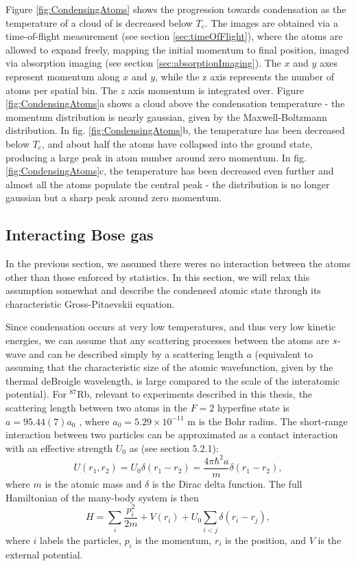Figure \ref{fig:CondensingAtoms} shows the progression towards condensation as the temperature of a cloud of \Rb{} is decreased below $T_c$. The images are obtained via a time-of-flight measurement (see section \ref{sec:timeOfFlight}), where the atoms are allowed to expand freely, mapping the initial momentum to final position, imaged via absorption imaging (see section \ref{sec:absorptionImaging}). The $x$ and $y$ axes represent momentum along $x$ and $y$, while the z axis represents the number of atoms per spatial bin. The $z$ axis momentum is integrated over.  Figure \ref{fig:CondensingAtoms}a shows a cloud above the condensation temperature - the momentum distribution is nearly gaussian, given by the Maxwell-Boltzmann distribution. In  fig. \ref{fig:CondensingAtoms}b, the temperature has been decreased below $T_c$, and about half the atoms have collapsed into the ground state, producing a large peak in atom number around zero momentum. In  fig. \ref{fig:CondensingAtoms}c, the temperature has been decreased even further and almost all the atoms populate the central peak - the distribution is no longer gaussian but a sharp peak around zero momentum. 


\subsection{Interacting Bose gas}

In the previous section, we assumed there weres no interaction between the atoms other than those enforced by statistics. In this section, we will relax this assumption somewhat and describe the condensed atomic state through its characteristic Gross-Pitaevskii equation. 

Since condensation occurs at very low temperatures, and thus very low kinetic energies, we can assume that any scattering processes between the atoms are $\it{s}$-wave and can be described simply by a scattering length $a$ (equivalent to assuming that the characteristic size of the atomic wavefunction, given by the thermal deBroigle wavelength, is large compared to the scale of the interatomic potential). For $^{87}$Rb, relevant to experiments described in this thesis, the scattering length between two atoms in the $F=2$ hyperfine state is $a=95.44(7) a_0$ \cite{Egorov2013}, where $a_0=5.29\times10^{-11}$ m is the Bohr radius. The short-range interaction between two particles can be approximated as a contact interaction with an effective strength $U_0$ as (see \cite{Pethick} section 5.2.1):
\begin{equation}
U(r_1,r_2) = U_0 \delta(r_1-r_2) = \frac{4\pi\hbar^2 a}{m} \delta(r_1-r_2),
\end{equation}
where $m$ is the atomic mass and $\delta$ is the Dirac delta function. The full Hamiltonian of the many-body system is then
\begin{equation}
H=\sum_i \frac{p_i^2}{2m} + V(r_i) + U_0\sum_{i<j}\delta(r_i-r_j),
\end{equation}
where $i$ labels the particles, $p_i$ is the momentum, $r_i$ is the position, and $V$ is the external potential.


